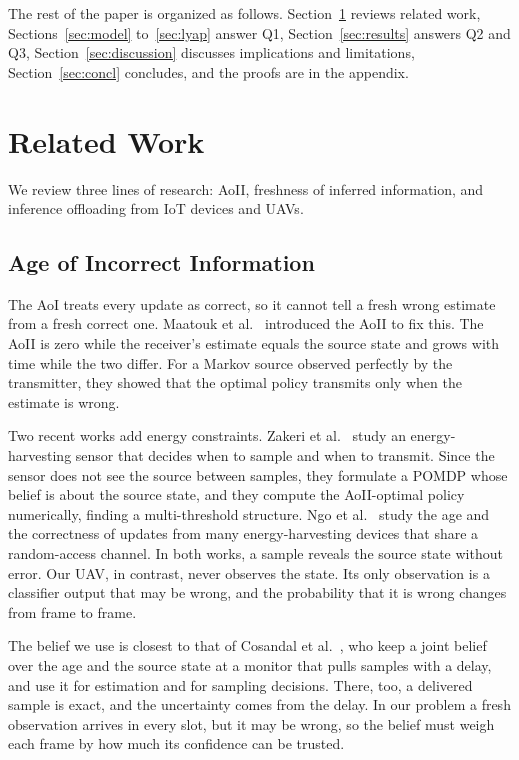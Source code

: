 \documentclass[5p,twocolumn]{elsarticle}
\theoremstyle{remark}
\begin{document}
The rest of the paper is organized as follows. Section~\ref{sec:related} reviews related work, Sections~\ref{sec:model} to~\ref{sec:lyap} answer Q1, Section~\ref{sec:results} answers Q2 and Q3, Section~\ref{sec:discussion} discusses implications and limitations, Section~\ref{sec:concl} concludes, and the proofs are in the appendix.
\section{Related Work}\label{sec:related}
We review three lines of research: AoII, freshness of inferred information, and inference offloading from IoT devices and UAVs.

\subsection{Age of Incorrect Information}
The AoI treats every update as correct, so it cannot tell a fresh wrong estimate from a fresh correct one. Maatouk et al.~\cite{maatouk2020aoii} introduced the AoII to fix this. The AoII is zero while the receiver's estimate equals the source state and grows with time while the two differ. For a Markov source observed perfectly by the transmitter, they showed that the optimal policy transmits only when the estimate is wrong.

Two recent works add energy constraints. Zakeri et al.~\cite{zakeri2023aoiieh} study an energy-harvesting sensor that decides when to sample and when to transmit. Since the sensor does not see the source between samples, they formulate a POMDP whose belief is about the source state, and they compute the AoII-optimal policy numerically, finding a multi-threshold structure. Ngo et al.~\cite{ngo2025eh} study the age and the correctness of updates from many energy-harvesting devices that share a random-access channel. In both works, a sample reveals the source state without error. Our UAV, in contrast, never observes the state. Its only observation is a classifier output that may be wrong, and the probability that it is wrong changes from frame to frame.

The belief we use is closest to that of Cosandal et al.~\cite{cosandal2024joint}, who keep a joint belief over the age and the source state at a monitor that pulls samples with a delay, and use it for estimation and for sampling decisions. There, too, a delivered sample is exact, and the uncertainty comes from the delay. In our problem a fresh observation arrives in every slot, but it may be wrong, so the belief must weigh each frame by how much its confidence can be trusted.
\end{document}
